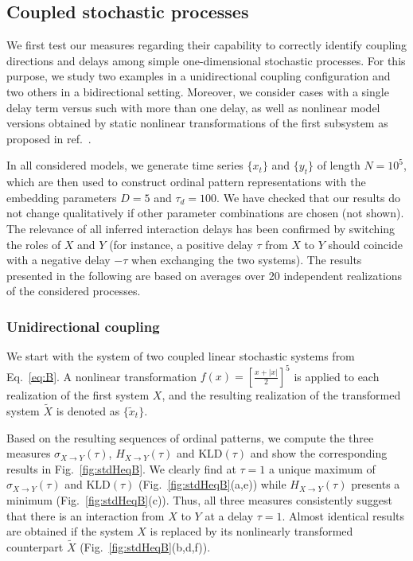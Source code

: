 \documentclass[12pt,aip,cha,reprint,nofootinbib]{revtex4-1}
\begin{document}
\subsection{Coupled stochastic processes} \label{sec:GCs}
We first test our measures regarding their capability to correctly identify coupling directions and delays among simple one-dimensional stochastic processes. For this purpose, we study two examples in a unidirectional coupling configuration and two others in a bidirectional setting. Moreover, we consider cases with a single delay term versus such with more than one delay, as well as nonlinear model versions obtained by static nonlinear transformations of the first subsystem as proposed in ref.~\cite{LiPRE2018}.

In all considered models, we generate time series $\{ x_t \}$ and $\{ y_t \}$ of length $N=10^{5}$, which are then used to construct ordinal pattern representations with the embedding parameters $D = 5$ and $\tau_d = 100$. We have checked that our results do not change qualitatively if other parameter combinations are chosen (not shown). The relevance of all inferred interaction delays has been confirmed by switching the roles of $X$ and $Y$ (for instance, a positive delay $\tau$ from $X$ to $Y$ should coincide with a negative delay $-\tau$ when exchanging the two systems). The results presented in the following are based on averages over 20 independent realizations of the considered processes. 

\subsubsection{Unidirectional coupling}

We start with the system of two coupled linear stochastic systems from Eq.~\eqref{eq:B}. A nonlinear transformation $f(x) = \left[\frac{x + | x |}{2}\right]^{5}$ is applied to each realization of the first system $X$, and the resulting realization of the transformed system $\tilde{X}$ is denoted as $\{\tilde{x}_t\}$. 

Based on the resulting sequences of ordinal patterns, we compute the three measures $\sigma_{X \to Y}(\tau)$, $H_{X \to Y}(\tau)$ and $\text{KLD}(\tau)$ and show the corresponding results in Fig.~\ref{fig:stdHeqB}. We clearly find at $\tau = 1$ a unique maximum of $\sigma_{X \to Y}(\tau)$ and $\text{KLD}(\tau)$ (Fig.~\ref{fig:stdHeqB}(a,e)) while $H_{X\to Y}(\tau)$ presents a minimum (Fig.~\ref{fig:stdHeqB}(c)). Thus, all three measures consistently suggest that there is an interaction from $X$ to $Y$ at a delay $\tau = 1$. Almost identical results are obtained if the system $X$ is replaced by its nonlinearly transformed counterpart $\tilde{X}$ (Fig.~\ref{fig:stdHeqB}(b,d,f)). 
\end{document}
